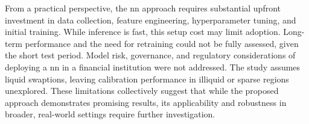 From a practical perspective, the \ac{nn} approach requires substantial upfront investment in data collection, feature engineering, hyperparameter tuning, and initial training. While inference is fast, this setup cost may limit adoption. Long-term performance and the need for retraining could not be fully assessed, given the short test period. Model risk, governance, and regulatory considerations of deploying a \ac{nn} in a financial institution were not addressed. The study assumes liquid swaptions, leaving calibration performance in illiquid or sparse regions unexplored. These limitations collectively suggest that while the proposed approach demonstrates promising results, its applicability and robustness in broader, real-world settings require further investigation.
